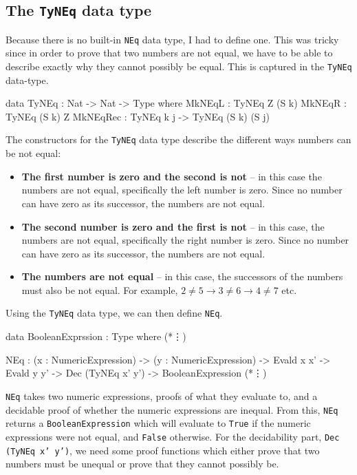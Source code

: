     \subsection{The \texttt{TyNEq} data type}
        Because there is no built-in \texttt{NEq} data type, I had to define one. This was tricky since in order to prove that two numbers are not equal, we have to be able to describe exactly why they cannot possibly be equal. This is captured in the \texttt{TyNEq} data-type.
        \begin{code}[label={des:neq:ty-neq}, caption={The data-type used for capturing inequality}]
        data TyNEq : Nat -> Nat -> Type where
            MkNEqL   : TyNEq Z (S k)
            MkNEqR   : TyNEq (S k) Z
            MkNEqRec : TyNEq k j -> TyNEq (S k) (S j)
        \end{code}
        The constructors for the \texttt{TyNEq} data type describe the different ways numbers can be not equal:
        \begin{itemize}
            \item \textbf{The first number is zero and the second is not} -- in this case the numbers are not equal, specifically the left number is zero. Since no number can have zero as its successor, the numbers are not equal.
            \item \textbf{The second number is zero and the first is not} -- in this case, the numbers are not equal, specifically the right number is zero. Since no number can have zero as its successor, the numbers are not equal.
            \item \textbf{The numbers are not equal} -- in this case, the successors of the numbers must also be not equal. For example, $2 \neq 5 \rightarrow 3 \neq 6 \rightarrow 4 \neq 7$ etc.
        \end{itemize}
        Using the \texttt{TyNEq} data type, we can then define \texttt{NEq}.
        \begin{code}[label={des:neq-code}, caption={The definition of \texttt{NEq}}, escapeinside={(*}{*)}]
        data BooleanExprssion : Type where
            (*\vdots*)
            
            NEq :  (x : NumericExpression)
                -> (y : NumericExpression)
                -> Evald x x'
                -> Evald y y'
                -> Dec (TyNEq x' y')
                -> BooleanExpression
            (*\vdots*)
        \end{code}
    
        \texttt{NEq} takes two numeric expressions, proofs of what they evaluate to, and a decidable proof of whether the numeric expressions are inequal. From this, \texttt{NEq} returns a \texttt{BooleanExpression} which will evaluate to \texttt{True} if the numeric expressions were not equal, and \texttt{False} otherwise. For the decidability part,\linebreak
        \texttt{Dec (TyNEq x' y')}, we need some proof functions which either prove that two numbers must be unequal or prove that they cannot possibly be.
    
